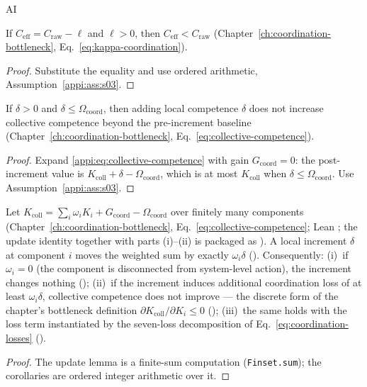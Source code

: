 \begin{authbar}{AI}
\begin{lemma}
\label{appi:lem:p12}
If \(C_{\mathrm{eff}}=C_{\mathrm{raw}}-\ell\) and \(\ell>0\), then \(C_{\mathrm{eff}}<C_{\mathrm{raw}}\) (Chapter~\ref{ch:coordination-bottleneck}, Eq.~\eqref{eq:kappa-coordination}).
\end{lemma}
\begin{proof}
Substitute the equality and use ordered arithmetic, Assumption~\ref{appi:ass:s03}.
\end{proof}

\begin{lemma}
\label{appi:lem:p12-coll}
If \(\delta>0\) and \(\delta\leq \Omega_{\mathrm{coord}}\), then adding local competence \(\delta\) does not increase collective competence beyond the pre-increment baseline (Chapter~\ref{ch:coordination-bottleneck}, Eq.~\eqref{eq:collective-competence}).
\end{lemma}
\begin{proof}
Expand \eqref{appi:eq:collective-competence} with gain \(G_{\mathrm{coord}}=0\): the post-increment value is \(K_{\mathrm{coll}}+\delta-\Omega_{\mathrm{coord}}\), which is at most \(K_{\mathrm{coll}}\) when \(\delta\leq \Omega_{\mathrm{coord}}\). Use Assumption~\ref{appi:ass:s03}.
\end{proof}

\begin{lemma}
\label{appi:lem:p12w}
Let \(K_{\mathrm{coll}} = \sum_i \omega_i K_i + G_{\mathrm{coord}} - \Omega_{\mathrm{coord}}\) over finitely many components (Chapter~\ref{ch:coordination-bottleneck}, Eq.~\eqref{eq:collective-competence}; Lean ; the update identity together with parts (i)--(ii) is packaged as ).
A local increment \(\delta\) at component \(i\) moves the weighted sum by exactly \(\omega_i\delta\) ().
Consequently:
(i)~if \(\omega_i=0\) (the component is disconnected from system-level action), the increment changes nothing ();
(ii)~if the increment induces additional coordination loss of at least \(\omega_i\delta\), collective competence does not improve --- the discrete form of the chapter's bottleneck definition \(\partial K_{\mathrm{coll}}/\partial K_i\leq 0\) ();
(iii)~the same holds with the loss term instantiated by the seven-loss decomposition of Eq.~\eqref{eq:coordination-losses} ().
\end{lemma}
\begin{proof}
The update lemma is a finite-sum computation (\texttt{Finset.sum}); the corollaries are ordered integer arithmetic over it.
\end{proof}


\end{authbar}

